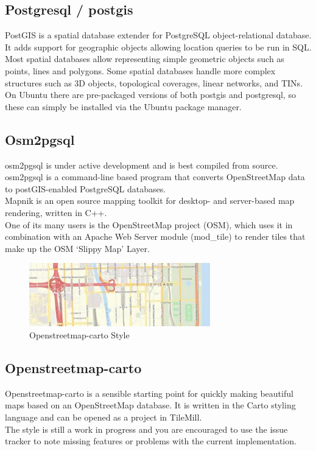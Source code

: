 \subsection{Postgresql / postgis}
PostGIS is a spatial database extender for PostgreSQL object-relational database. It adds support for geographic objects allowing location queries to be run in SQL.\\
Most spatial databases allow representing simple geometric objects such as points, lines and polygons. Some spatial databases handle more complex structures such as 3D objects, topological coverages, linear networks, and TINs.\\
On Ubuntu there are pre-packaged versions of both postgis and postgresql, so these can simply be installed via the Ubuntu package manager.\\
\subsection{Osm2pgsql}
 osm2pgsql is under active development and is best compiled from source.\\
osm2pgsql is a command-line based program that converts OpenStreetMap data to postGIS-enabled PostgreSQL databases.\\
Mapnik is an open source mapping toolkit for desktop- and server-based map rendering, written in C++.\\
One of its many users is the OpenStreetMap project (OSM), which uses it in combination with an Apache Web Server module (mod\_tile) to render tiles that make up the OSM ‘Slippy Map’ Layer.\\
\begin{figure}[!ht]
\centering
\includegraphics[width=0.7\textwidth]{input/images/bright.jpeg}                   
\caption{Openstreetmap-carto Style}
\hspace{-1.5em}
\end{figure}



\subsection{Openstreetmap-carto}
Openstreetmap-carto is a sensible starting point for quickly making beautiful maps based on an OpenStreetMap database. It is written in the Carto styling language and can be opened as a project in TileMill.\\
The style is still a work in progress and you are encouraged to use the issue tracker to note missing features or problems with the current implementation.\\
\iffalse

